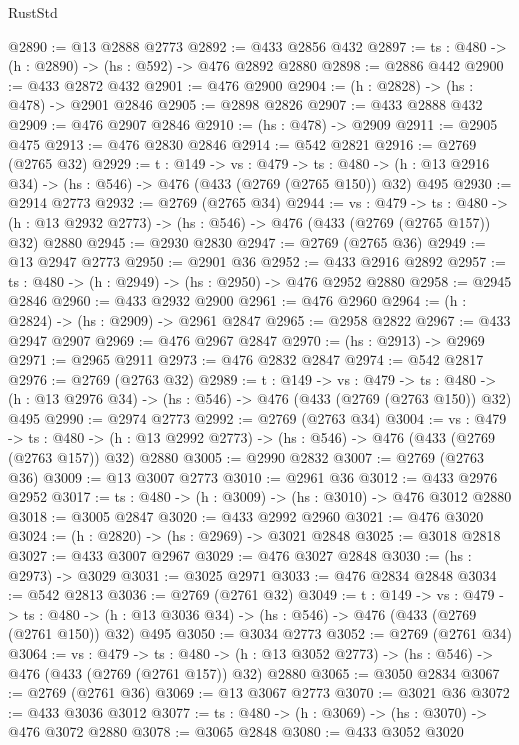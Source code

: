 \begin{lexlean}{RustStd}
\begin{coremodule}
@2890 := @13 @2888 @2773
@2892 := @433 @2856 @432
@2897 := {ts : @480} -> (h : @2890) -> (hs : @592) -> @476 @2892 @2880
@2898 := @2886 @442
@2900 := @433 @2872 @432
@2901 := @476 @2900
@2904 := (h : @2828) -> (hs : @478) -> @2901 @2846
@2905 := @2898 @2826
@2907 := @433 @2888 @432
@2909 := @476 @2907 @2846
@2910 := (hs : @478) -> @2909
@2911 := @2905 @475
@2913 := @476 @2830 @2846
@2914 := @542 @2821
@2916 := @2769 (@2765 @32)
@2929 := {t : @149} ->
  {vs : @479} ->
  {ts : @480} -> (h : @13 @2916 @34) -> (hs : @546) -> @476 (@433 (@2769 (@2765 @150)) @32) @495
@2930 := @2914 @2773
@2932 := @2769 (@2765 @34)
@2944 := {vs : @479} ->
  {ts : @480} -> (h : @13 @2932 @2773) -> (hs : @546) -> @476 (@433 (@2769 (@2765 @157)) @32) @2880
@2945 := @2930 @2830
@2947 := @2769 (@2765 @36)
@2949 := @13 @2947 @2773
@2950 := @2901 @36
@2952 := @433 @2916 @2892
@2957 := {ts : @480} -> (h : @2949) -> (hs : @2950) -> @476 @2952 @2880
@2958 := @2945 @2846
@2960 := @433 @2932 @2900
@2961 := @476 @2960
@2964 := (h : @2824) -> (hs : @2909) -> @2961 @2847
@2965 := @2958 @2822
@2967 := @433 @2947 @2907
@2969 := @476 @2967 @2847
@2970 := (hs : @2913) -> @2969
@2971 := @2965 @2911
@2973 := @476 @2832 @2847
@2974 := @542 @2817
@2976 := @2769 (@2763 @32)
@2989 := {t : @149} ->
  {vs : @479} ->
  {ts : @480} -> (h : @13 @2976 @34) -> (hs : @546) -> @476 (@433 (@2769 (@2763 @150)) @32) @495
@2990 := @2974 @2773
@2992 := @2769 (@2763 @34)
@3004 := {vs : @479} ->
  {ts : @480} -> (h : @13 @2992 @2773) -> (hs : @546) -> @476 (@433 (@2769 (@2763 @157)) @32) @2880
@3005 := @2990 @2832
@3007 := @2769 (@2763 @36)
@3009 := @13 @3007 @2773
@3010 := @2961 @36
@3012 := @433 @2976 @2952
@3017 := {ts : @480} -> (h : @3009) -> (hs : @3010) -> @476 @3012 @2880
@3018 := @3005 @2847
@3020 := @433 @2992 @2960
@3021 := @476 @3020
@3024 := (h : @2820) -> (hs : @2969) -> @3021 @2848
@3025 := @3018 @2818
@3027 := @433 @3007 @2967
@3029 := @476 @3027 @2848
@3030 := (hs : @2973) -> @3029
@3031 := @3025 @2971
@3033 := @476 @2834 @2848
@3034 := @542 @2813
@3036 := @2769 (@2761 @32)
@3049 := {t : @149} ->
  {vs : @479} ->
  {ts : @480} -> (h : @13 @3036 @34) -> (hs : @546) -> @476 (@433 (@2769 (@2761 @150)) @32) @495
@3050 := @3034 @2773
@3052 := @2769 (@2761 @34)
@3064 := {vs : @479} ->
  {ts : @480} -> (h : @13 @3052 @2773) -> (hs : @546) -> @476 (@433 (@2769 (@2761 @157)) @32) @2880
@3065 := @3050 @2834
@3067 := @2769 (@2761 @36)
@3069 := @13 @3067 @2773
@3070 := @3021 @36
@3072 := @433 @3036 @3012
@3077 := {ts : @480} -> (h : @3069) -> (hs : @3070) -> @476 @3072 @2880
@3078 := @3065 @2848
@3080 := @433 @3052 @3020

\end{coremodule}
\end{lexlean}

